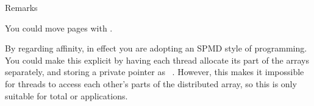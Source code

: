 \begin{comment}
\begin{exercise}
  \label{ex:first-touch}
  Finish the following fragment and run it with first all the cores of
  one socket, then all cores of both sockets. (If you know how to do
  explicit placement, you can also try fewer cores.)
\begin{lstlisting}
  for (int i=0; i<nlocal+2; i++)
    in[i] = 1.;
  for (int i=0; i<nlocal; i++)
    out[i] = 0.;

  for (int step=0; step<nsteps; step++) {
#pragma omp parallel for schedule(static)
    for (int i=0; i<nlocal; i++) {
      out[i] = ( in[i]+in[i+1]+in[i+2] )/3.;
    }
#pragma omp parallel for schedule(static)
    for (int i=0; i<nlocal; i++)
      in[i+1] = out[i];
    in[0] = 0; in[nlocal+1] = 1;
  }
\end{lstlisting}
\end{exercise}
\end{comment}

 {Remarks}

You could move pages with .

By regarding affinity,
in effect you are adopting an \ac{SPMD} style of programming.
You could make this explicit by having each thread allocate its part
of the arrays separately, and storing a private pointer as
~\cite{Liu:2003:OMP-SPMD}. However, this
makes it impossible for threads to access each other's parts of the
distributed array, so this is only suitable for
total  or
 applications.

\begin{comment}
[c202-002 c:1] export OMP_PLACES=cores
[c202-002 c:2] export OMP_PROC_BIND=close
[c202-002 c:3] make heat && OMP_NUM_THREADS=56 ./heat
make: `heat' is up to date.
Time=  2.0048 #ops=2.000e+09 on 56 threads
[c202-002 c:4] make heat && OMP_NUM_THREADS=56 ./heat
make: `heat' is up to date.
Time=  2.2479 #ops=2.000e+09 on 56 threads
[c202-002 c:5] make heat && OMP_NUM_THREADS=56 ./heat
make: `heat' is up to date.
Time=  1.9717 #ops=2.000e+09 on 56 threads
[c202-002 c:6] make heat && OMP_NUM_THREADS=56 ./heat
make: `heat' is up to date.
Time=  2.1107 #ops=2.000e+09 on 56 threads
[c202-002 c:7] make heat && OMP_NUM_THREADS=56 ./heat
make: `heat' is up to date.
Time=  2.1087 #ops=2.000e+09 on 56 threads
[c202-002 c:8] make heat && OMP_NUM_THREADS=56 ./heat 1
make: `heat' is up to date.
Parallel init
Time=  1.0420 #ops=2.000e+09 on 56 threads
[c202-002 c:9] make heat && OMP_NUM_THREADS=56 ./heat 1
make: `heat' is up to date.
Parallel init
Time=  0.9962 #ops=2.000e+09 on 56 threads
[c202-002 c:10] make heat && OMP_NUM_THREADS=56 ./heat 1
make: `heat' is up to date.
Parallel init
Time=  1.0077 #ops=2.000e+09 on 56 threads
[c202-002 c:11] make heat && OMP_NUM_THREADS=56 ./heat 1
make: `heat' is up to date.
Parallel init
Time=  0.9939 #ops=2.000e+09 on 56 threads
[c202-002 c:12] make heat && OMP_NUM_THREADS=56 ./heat 1
make: `heat' is up to date.
Parallel init
Time=  0.9880 #ops=2.000e+09 on 56 threads
\end{comment}

